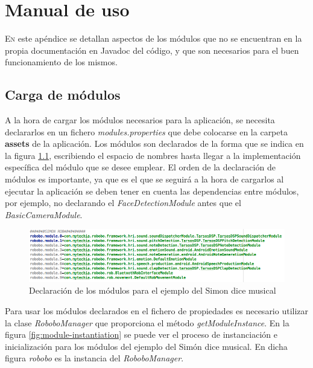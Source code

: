 \newpage
 

\chapter{Manual de uso}
\label{chap:usage}

\lettrine{E}{n} este apéndice se detallan aspectos de los módulos que no se encuentran en la propia documentación en Javadoc del código, y que son necesarios para el buen funcionamiento de los mismos.

\section{Carga de módulos}

A la hora de cargar los módulos necesarios para la aplicación, se necesita declararlos en un fichero \textit{modules.properties} que debe colocarse en la carpeta \textbf{assets} de la aplicación. Los módulos son declarados de la forma que se indica en la figura \ref{fig:module-declaration}, escribiendo el espacio de nombres hasta llegar a la implementación específica del módulo que se desee emplear.
El orden de la declaración de módulos es importante, ya que es el que se seguirá a la hora de cargarlos al ejecutar la aplicación se deben tener en cuenta las dependencias entre módulos, por ejemplo, no declarando el \textit{FaceDetectionModule} antes que el \textit{BasicCameraModule}.
\begin{figure}
	\centering
	\includegraphics[width=1.1\linewidth]{imagenes/moduledeclaration.png}
	\caption{Declaración de los módulos para el ejemplo del Simon dice musical}
	\label{fig:module-declaration}
\end{figure}

Para usar los módulos declarados en el fichero de propiedades es necesario utilizar la clase \textit{RoboboManager} que proporciona el método \textit{getModuleInstance}. En la figura \ref{fig:module-instantiation} se puede ver el proceso de instanciación e inicialización para los módulos del ejemplo del Simón dice musical. En dicha figura \textit{robobo} es la instancia del \textit{RoboboManager}.

